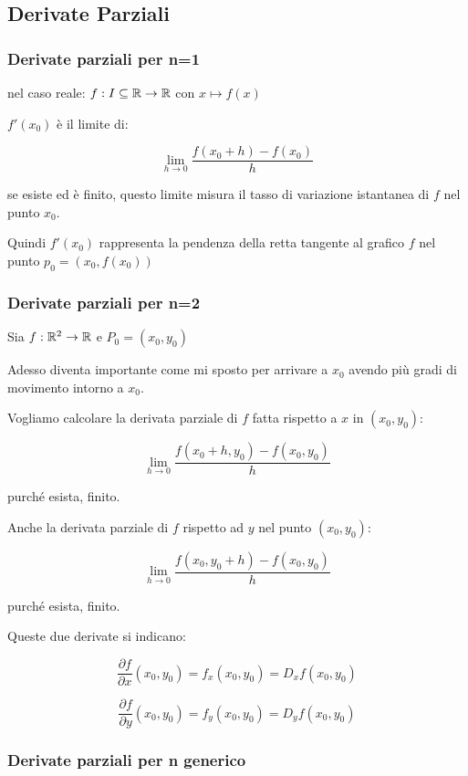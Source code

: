 \subsection{Derivate Parziali}

\subsubsection{Derivate parziali per n=1}

nel caso reale: \(f: I \subseteq \mathbb{R} \to \mathbb{R} \) con \(x \mapsto f(x)\)

\(f'(x_0)\) è il limite di:

\[
    \lim_{ h \to 0 } \frac{f(x_0+h)-f(x_0)}{h}
\]

se esiste ed è finito, questo limite misura il tasso di variazione istantanea di \(f\) nel punto \(x_0\).

Quindi \(f'(x_0)\) rappresenta la pendenza della retta tangente al grafico \(f\) nel punto \(p_0=(x_0,f(x_0))\)

\subsubsection{Derivate parziali per n=2}

Sia \(f: \mathbb{R}^2 \to \mathbb{R} \) e \(P_0=(x_0,y_0)\)

Adesso diventa importante come mi sposto per arrivare a \(x_0\) avendo più gradi di movimento intorno a \(x_0\).

Vogliamo calcolare la derivata parziale di \(f\) fatta rispetto a \(x\) in \((x_0,y_0)\):

\[
    \lim_{ h \to 0 } \frac{f(x_0+h,y_0) -f(x_0,y_0)}{h}
\]

purché esista, finito.

Anche la derivata parziale di \(f\) rispetto ad \(y\) nel punto \((x_0,y_0)\):

\[
    \lim_{ h \to 0 } \frac{f(x_0,y_0+h) - f(x_0,y_0)}{h}
\]

purché esista, finito.

Queste due derivate si indicano:

\[
    \frac{\partial f}{\partial x}(x_0,y_0) = f_x(x_0,y_0) = D_{x}f(x_0,y_0)
\]

\[
    \frac{\partial f}{\partial y}(x_0,y_0) = f_y(x_0,y_0)= D_{y}f(x_0,y_0)
\]

\filbreak{}
\subsubsection{Derivate parziali per n generico}

